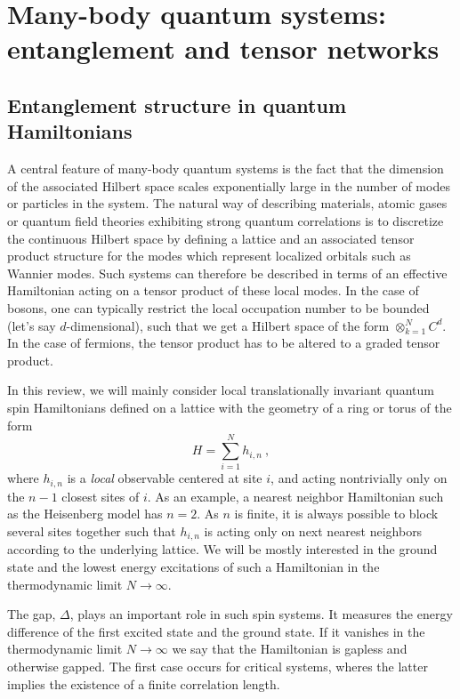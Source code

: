 \documentclass[rmp,aps,reprint,superscriptaddress,nobalancelastpage]{revtex4-1}
\begin{document}
\section{Many-body quantum systems: entanglement and tensor networks}

\subsection{Entanglement structure in quantum Hamiltonians}

A central feature of many-body quantum systems is the fact that the dimension of the associated Hilbert space scales exponentially large in the number of modes or particles in the system. The natural way of describing materials, atomic gases or quantum field theories exhibiting strong quantum correlations is to discretize the continuous Hilbert space by defining a lattice and an associated tensor product structure for the modes which represent localized orbitals such as Wannier modes.   Such systems can therefore be described in terms of an effective Hamiltonian acting on a tensor product of these local modes. In the case of bosons, one can typically restrict the local occupation number to be bounded (let's say $d$-dimensional), such that we get a Hilbert space of the form $\otimes_{k=1}^N C^d$. In the case of fermions, the tensor product has to be altered to a graded tensor product.

In this review, we will mainly consider local translationally invariant quantum spin Hamiltonians defined on a lattice with the geometry of a ring or torus  of the form
\[
    H=\sum_{i=1}^N h_{i,n}\ ,
\]
where $h_{i,n}$ is a \emph{local} observable centered at site $i$, and acting nontrivially only on the $n-1$ closest sites of $i$. As an example, a nearest neighbor Hamiltonian such as the Heisenberg model has $n=2$. As $n$ is finite, it is always possible to block several sites together such that $h_{i,n}$ is acting only on next nearest neighbors according to the underlying lattice. We will be mostly interested in the ground state   and the lowest energy excitations of such a Hamiltonian in the thermodynamic limit  $N\to \infty$.

The  gap, $\Delta$, plays an important role in such spin systems. It measures the energy difference of the first excited state and the ground state. If it vanishes in the thermodynamic limit $N\rightarrow\infty$ we say that the Hamiltonian is gapless and otherwise gapped. The first case occurs for critical systems, wheres the latter implies the existence of a finite correlation length.
\end{document}
